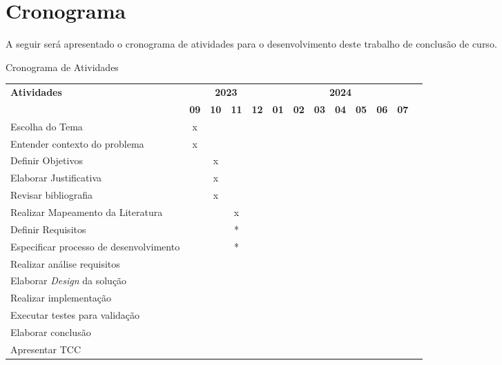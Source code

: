 

% 

% 







\textual









\chapter{Cronograma}
A seguir será apresentado o cronograma de atividades para o desenvolvimento deste trabalho de conclusão de curso.
\begin{quadro}[H]
    \centering
    \caption{Cronograma de Atividades}
    \begin{tabular}{|p{3.5cm}|c|c|c|c|c|c|c|c|c|c|c|c|}
        \hline
        \multirow{2}{*}{\textbf{Atividades}} & \multicolumn{4}{c|}{\textbf{2023}} & \multicolumn{7}{c|}{\textbf{2024}} \\ \cline{2-12}
        & \textbf{09} & \textbf{10} & \textbf{11} & \textbf{12} & \textbf{01} & \textbf{02} & \textbf{03} & \textbf{04} & \textbf{05} & \textbf{06} & \textbf{07} \\ \hline
        Escolha do Tema & x & & & & & & & & & & \\ \hline
        Entender contexto do problema & x & & & & & & & & & & \\ \hline
        Definir Objetivos & & x & & & & & & & & & \\ \hline
        Elaborar Justificativa & & x & & & & & & & & & \\ \hline
        Revisar bibliografia & & x & & & & & & & & & \\ \hline
        Realizar Mapeamento da Literatura & & & x & & & & & & & & \\ \hline
        Definir Requisitos & & & * & & & & & & & & \\ \hline
        Especificar processo de desenvolvimento & & & * & & & & & & & & \\ \hline
        Realizar análise requisitos & & & & & & & & & & & \\ \hline
        Elaborar \textit{Design} da solução & & & & & & & & & & & \\ \hline
        Realizar implementação & & & & & & & & & & & \\ \hline
        Executar testes para validação & & & & & & & & & & & \\ \hline
        Elaborar conclusão & & & & & & & & & & & \\ \hline
        Apresentar TCC & & & & & & & & & & & \\ \hline
      \end{tabular}
    \label{quad:cronograma}
\end{quadro}
% 

